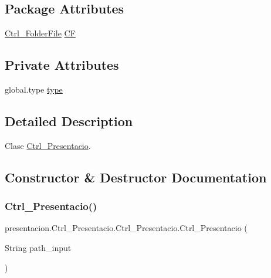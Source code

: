 \subsection*{Package Attributes}
\begin{DoxyCompactItemize}
\item 
\hyperlink{classdomini_1_1folders_1_1Ctrl__FolderFile}{Ctrl\+\_\+\+Folder\+File} \hyperlink{classpresentacion_1_1Ctrl__Presentacio_1_1Ctrl__Presentacio_af46ef2ef420276ff830c2f0ff8c1a7e6}{CF}
\end{DoxyCompactItemize}
\subsection*{Private Attributes}
\begin{DoxyCompactItemize}
\item 
global.\+type \hyperlink{classpresentacion_1_1Ctrl__Presentacio_1_1Ctrl__Presentacio_af72267ee1302df6b5982c3248d5a19b0}{type}
\end{DoxyCompactItemize}


\subsection{Detailed Description}
Clase \hyperlink{classpresentacion_1_1Ctrl__Presentacio_1_1Ctrl__Presentacio}{Ctrl\+\_\+\+Presentacio}. 

\subsection{Constructor \& Destructor Documentation}
\mbox{\label{classpresentacion_1_1Ctrl__Presentacio_1_1Ctrl__Presentacio_a3d3ac2a3c4b9fa715bb631fdf3a955dd}} 
\subsubsection{\texorpdfstring{Ctrl\+\_\+\+Presentacio()}{Ctrl\_Presentacio()}}
{\footnotesize\ttfamily presentacion.\+Ctrl\+\_\+\+Presentacio.\+Ctrl\+\_\+\+Presentacio.\+Ctrl\+\_\+\+Presentacio (\begin{DoxyParamCaption}\item[{String}]{path\+\_\+input }\end{DoxyParamCaption})\hspace{0.3cm}{\ttfamily [inline]}}



